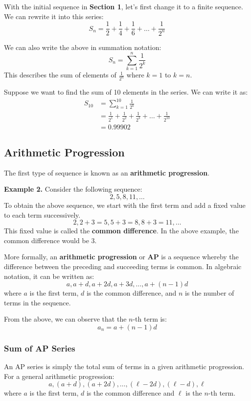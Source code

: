 \documentclass[12pt]{article}
\begin{document}
With the initial sequence in \textbf{Section 1}, let's first change it to a finite sequence. We can rewrite it into this series:
\[
	S_{n} = \frac{1}{2} + \frac{1}{4} + \frac{1}{6} + \dots + \frac{1}{2^{n}}
\]

We can also write the above in summation notation:
\[
	S_{n} = \displaystyle\sum_{k=1}^{n}\frac{1}{2^{k}}
\]
This describes the sum of elements of $\displaystyle\frac{1}{2^{n}}$ where $k=1$ to $k=n$.

Suppose we want to find the sum of 10 elements in the series. We can write it as:
\begin{align*}
	S_{10} & = \displaystyle\sum_{k=1}^{10}\frac{1}{2^{k}}                                    \\
	       & = \frac{1}{2^{1}} + \frac{1}{2^{2}} + \frac{1}{2^{3}} + \dots + \frac{1}{2^{10}} \\
	       & = 0.99902
\end{align*}

\subsection{Arithmetic Progression}

The first type of sequence is known as an \textbf{arithmetic progression}.

\textbf{Example 2.} Consider the following sequence:
\[
	2, 5, 8, 11, \dots
\]
To obtain the above sequence, we start with the first term and add a fixed value to each term successively.
\[
	2, 2 + 3 = 5, 5 + 3 = 8, 8 + 3 = 11, \dots
\]
This fixed value is called the \textbf{common difference}. In the above example, the common difference would be 3.

More formally, an \textbf{arithmetic progression} or \textbf{AP} is a sequence whereby the difference between the preceding and succeeding terms is common.
In algebraic notation, it can be written as:
\[
	a, a + d, a + 2d, a + 3d, \dots, a + (n-1)d
\]
where $a$ is the first term, $d$ is the common difference, and $n$ is the number of terms in the sequence.

From the above, we can observe that the $n$-th term is:
\[
	a_n = a + (n-1)d
\]

\subsubsection{Sum of AP Series}

An AP series is simply the total sum of terms in a given arithmetic progression. For a general arithmetic progression:
\[
	a, (a + d), (a + 2d), \dots, (\ell - 2d), (\ell - d), \ell
\]
where $a$ is the first term, $d$ is the common difference and $\ell$ is the $n$-th term.
\end{document}
